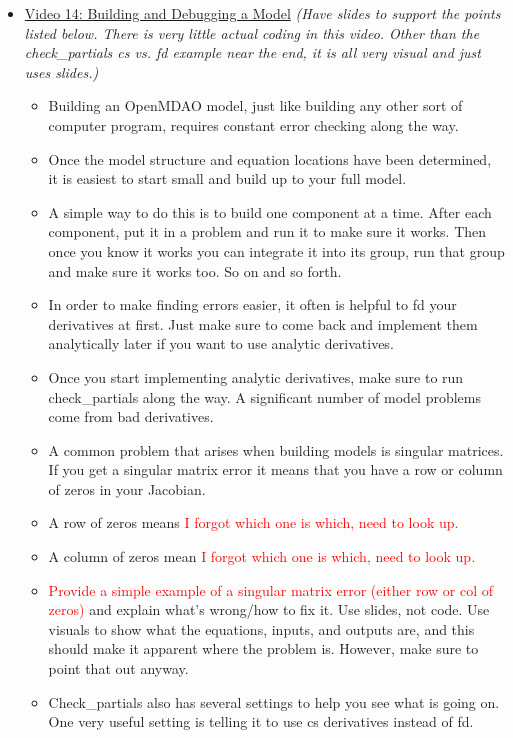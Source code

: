 \documentclass[12pt, letterpaper]{article}
\begin{document}
\begin{itemize}
	\item \underline{Video 14: Building and Debugging a Model} \textit{(Have slides to support the points listed below. There is very little actual coding in this video. Other than the check\_partials cs vs. fd example near the end, it is all very visual and just uses slides.)}
		\begin{itemize}
			\item Building an OpenMDAO model, just like building any other sort of computer program, requires constant error checking along the way.
			\item Once the model structure and equation locations have been determined, it is easiest to start small and build up to your full model.
			\item A simple way to do this is to build one component at a time. After each component, put it in a problem and run it to make sure it works. Then once you know it works you can integrate it into its group, run that group and make sure it works too. So on and so forth.
			\item In order to make finding errors easier, it often is helpful to fd your derivatives at first. Just make sure to come back and implement them analytically later if you want to use analytic derivatives.
			\item Once you start implementing analytic derivatives, make sure to run check\_partials along the way. A significant number of model problems come from bad derivatives.
			\item A common problem that arises when building models is singular matrices. If you get a singular matrix error it means that you have a row or column of zeros in your Jacobian.
			\item A row of zeros means \textcolor{red}{I forgot which one is which, need to look up.}
			\item A column of zeros mean \textcolor{red}{I forgot which one is which, need to look up.}
			\item \textcolor{red}{Provide a simple example of a singular matrix error (either row or col of zeros)} and explain what’s wrong/how to fix it. Use slides, not code. Use visuals to show what the equations, inputs, and outputs are, and this should make it apparent where the problem is. However, make sure to point that out anyway.
			\item Check\_partials also has several settings to help you see what is going on. One very useful setting is telling it to use cs derivatives instead of fd.

\end{itemize}
\end{itemize}
\end{document}
